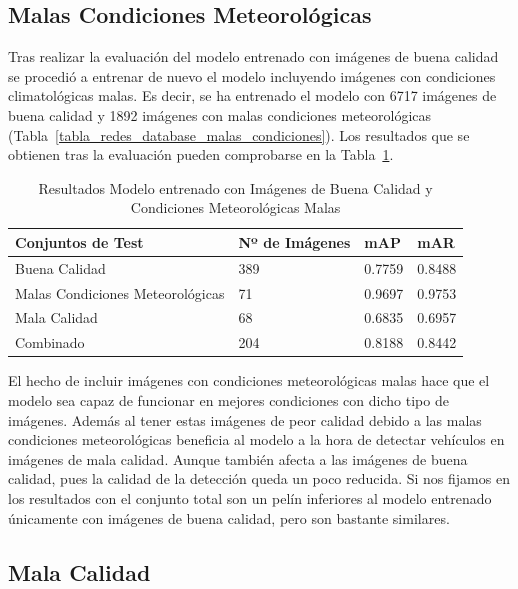 \subsection{Malas Condiciones Meteorológicas}

Tras realizar la evaluación del modelo entrenado con imágenes de buena calidad se procedió a entrenar de nuevo el modelo incluyendo imágenes con condiciones climatológicas malas. Es decir, se ha entrenado el modelo con 6717 imágenes de buena calidad y 1892 imágenes con malas condiciones meteorológicas (Tabla~\ref{tabla_redes_database_malas_condiciones}). Los resultados que se obtienen tras la evaluación pueden comprobarse en la Tabla~\ref{resultados_test_buenas_malas_condiciones}.

\begin{table}[H] 
\begin{center}
\begin{tabular}{|l|l|l|l|}
\hline
 Conjuntos de Test & Nº de Imágenes & mAP & mAR  \\ 
\hline \hline
Buena Calidad & 389 & 0.7759 & 0.8488 \\ \hline
Malas Condiciones Meteorológicas & 71 & 0.9697 & 0.9753 \\ \hline
Mala Calidad  & 68 & 0.6835 & 0.6957\\ \hline
Combinado & 204 & 0.8188 & 0.8442\\ \hline
\end{tabular}
\caption{Resultados Modelo entrenado con Imágenes de Buena Calidad y Condiciones Meteorológicas Malas}
\label{resultados_test_buenas_malas_condiciones}
\end{center}
\end{table}

El hecho de incluir imágenes con condiciones meteorológicas malas hace que el modelo sea capaz de funcionar en mejores condiciones con dicho tipo de imágenes. Además al tener estas imágenes de peor calidad debido a las malas condiciones meteorológicas beneficia al modelo a la hora de detectar vehículos en imágenes de mala calidad. Aunque también afecta a las imágenes de buena calidad, pues la calidad de la detección queda un poco reducida. Si nos fijamos en los resultados con el conjunto total son un pelín inferiores al modelo entrenado únicamente con imágenes de buena calidad, pero son bastante similares.


\subsection{Mala Calidad}

